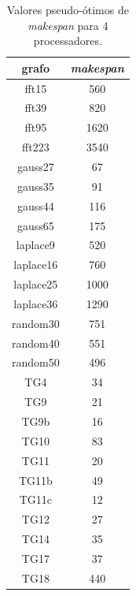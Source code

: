 \documentclass[fleqn,10pt]{SelfArx} %
\begin{document}
\begin{table}[]
\centering
\caption{Valores pseudo-ótimos de \textit{makespan} para 4 processadores.}
\label{tab:opt}
\begin{tabular}{|c|c|}
\hline
\textbf{grafo} & \textit{\textbf{makespan}} \\ \hline
fft15          & 560                        \\ \hline
fft39          & 820                        \\ \hline
fft95          & 1620                       \\ \hline
fft223         & 3540                       \\ \hline
gauss27        & 67                         \\ \hline
gauss35        & 91                         \\ \hline
gauss44        & 116                        \\ \hline
gauss65        & 175                        \\ \hline
laplace9       & 520                        \\ \hline
laplace16      & 760                        \\ \hline
laplace25      & 1000                       \\ \hline
laplace36      & 1290                       \\ \hline
random30       & 751                        \\ \hline
random40       & 551                        \\ \hline
random50       & 496                        \\ \hline
TG4            & 34                         \\ \hline
TG9            & 21                         \\ \hline
TG9b           & 16                         \\ \hline
TG10           & 83                         \\ \hline
TG11           & 20                         \\ \hline
TG11b          & 49                         \\ \hline
TG11c          & 12                         \\ \hline
TG12           & 27                         \\ \hline
TG14           & 35                         \\ \hline
TG17           & 37                         \\ \hline
TG18           & 440                        \\ \hline
\end{tabular}
\end{table}
\end{document}
